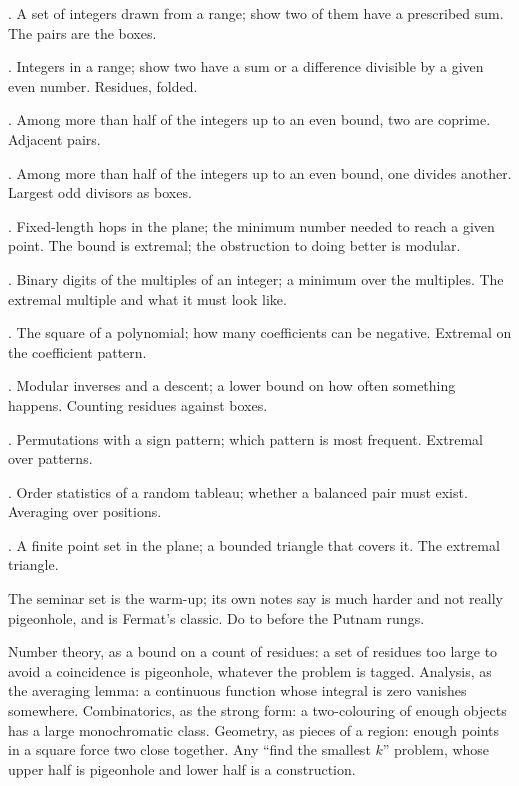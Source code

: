 \begin{ladder}
\item {}. A set of integers drawn from a range; show two of them have a prescribed sum. The pairs are the boxes.
\item {}. Integers in a range; show two have a sum or a difference divisible by a given even number. Residues, folded.
\item {}. Among more than half of the integers up to an even bound, two are coprime. Adjacent pairs.
\item {}. Among more than half of the integers up to an even bound, one divides another. Largest odd divisors as boxes.
\item {}. Fixed-length hops in the plane; the minimum number needed to reach a given point. The bound is extremal; the obstruction to doing better is modular.
\item {}. Binary digits of the multiples of an integer; a minimum over the multiples. The extremal multiple and what it must look like.
\item {}. The square of a polynomial; how many coefficients can be negative. Extremal on the coefficient pattern.
\item {}. Modular inverses and a descent; a lower bound on how often something happens. Counting residues against boxes.
\item {}. Permutations with a sign pattern; which pattern is most frequent. Extremal over patterns.
\item {}. Order statistics of a random tableau; whether a balanced pair must exist. Averaging over positions.
\item {}. A finite point set in the plane; a bounded triangle that covers it. The extremal triangle.
\end{ladder}

The seminar set  is the warm-up; its own notes say  is much harder and not really pigeonhole, and  is Fermat's classic. Do  to  before the Putnam rungs.

\begin{hides}
Number theory, as a bound on a count of residues: a set of residues too large to avoid a coincidence is pigeonhole, whatever the problem is tagged. Analysis, as the averaging lemma: a continuous function whose integral is zero vanishes somewhere. Combinatorics, as the strong form: a two-colouring of enough objects has a large monochromatic class. Geometry, as pieces of a region: enough points in a square force two close together. Any ``find the smallest $k$'' problem, whose upper half is pigeonhole and lower half is a construction.
\end{hides}

